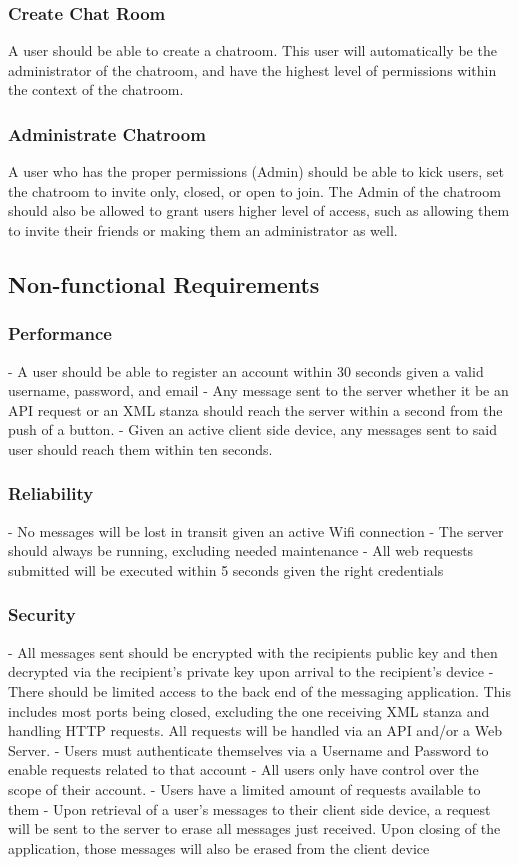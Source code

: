 \documentclass[11pt]{article}
\theoremstyle{plain}
\theoremstyle{definition}
\begin{document}
\subsubsection{Create Chat Room}
A user should be able to create a chatroom. This user will automatically be the administrator of the chatroom, and have the highest level of permissions within the context of the chatroom.
\subsubsection{Administrate Chatroom}
A user who has the proper permissions (Admin) should be able to kick users, set the chatroom to invite only, closed, or open to join. The Admin of the chatroom should also be allowed to grant users higher level of access, such as allowing them to invite their friends or making them an administrator as well.

\subsection{Non-functional Requirements}\label{sec:nonfuncrequirements}
\subsubsection{Performance}
- A user should be able to register an account within 30 seconds given a valid username, 
  password, and email
- Any message sent to the server whether it be an API request or an XML stanza should reach 
  the server within a second from the push of a button.
- Given an active client side device, any messages sent to said user should reach them 
  within ten seconds.
\subsubsection{Reliability}
- No messages will be lost in transit given an active Wifi connection
- The server should always be running, excluding needed maintenance
- All web requests submitted will be executed within 5 seconds given the right 
  credentials
\subsubsection{Security}
- All messages sent should be encrypted with the recipients public key and then decrypted 
  via the recipient's private key upon arrival to the recipient's device
- There should be limited access to the back end of the messaging application. This 
  includes most ports being closed, excluding the one receiving XML stanza and handling HTTP requests. All requests will be handled via an API and/or a Web Server.
- Users must authenticate themselves via a Username and Password to enable requests related 
  to that account
- All users only have control over the scope of their account.
- Users have a limited amount of requests available to them
- Upon retrieval of a user's messages to their client side device, a request will be sent to the server to erase all messages just received. Upon closing of the application, those messages will also be erased from the client device
\end{document}
